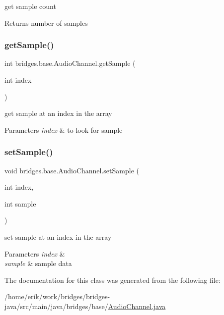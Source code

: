 get sample count 

\begin{DoxyReturn}{Returns}
number of samples 
\end{DoxyReturn}
\mbox{\label{classbridges_1_1base_1_1_audio_channel_a62b3fdc6e9e03996f15216d5f7f2d3fb}} 
\subsubsection{\texorpdfstring{get\+Sample()}{getSample()}}
{\footnotesize\ttfamily int bridges.\+base.\+Audio\+Channel.\+get\+Sample (\begin{DoxyParamCaption}\item[{int}]{index }\end{DoxyParamCaption})}



get sample at an index in the array 


\begin{DoxyParams}{Parameters}
{\em index} & to look for sample \\
\hline
\end{DoxyParams}
\mbox{\label{classbridges_1_1base_1_1_audio_channel_aea69a2dab1bb9cc8c930f476b8392fd9}} 
\subsubsection{\texorpdfstring{set\+Sample()}{setSample()}}
{\footnotesize\ttfamily void bridges.\+base.\+Audio\+Channel.\+set\+Sample (\begin{DoxyParamCaption}\item[{int}]{index,  }\item[{int}]{sample }\end{DoxyParamCaption})}



set sample at an index in the array 


\begin{DoxyParams}{Parameters}
{\em index} & \\
\hline
{\em sample} & sample data \\
\hline
\end{DoxyParams}


The documentation for this class was generated from the following file\+:\begin{DoxyCompactItemize}
\item 
/home/erik/work/bridges/bridges-\/java/src/main/java/bridges/base/\hyperlink{_audio_channel_8java}{Audio\+Channel.\+java}\end{DoxyCompactItemize}
